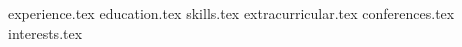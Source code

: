 \documentclass[11pt, a4paper]{awesome-cv}
\newcommand*{\sectiondir}{resume/}
\begin{document}
\makecvheader

{experience.tex}
{education.tex}
{skills.tex}
{extracurricular.tex}
{conferences.tex}
{interests.tex}
\end{document}
